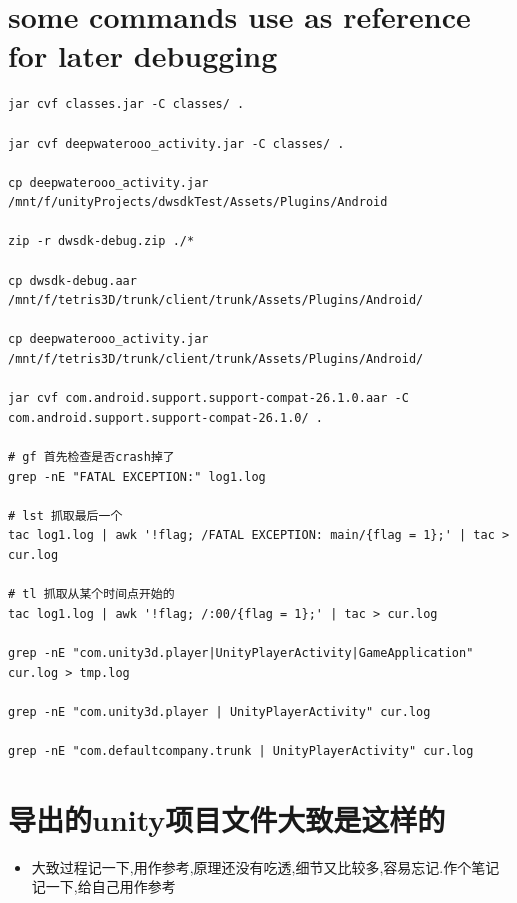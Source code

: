 \documentclass[9pt, b5paper]{article}
\begin{document}
\section{some commands use as reference for later debugging}
\label{sec-3}
\begin{verbatim}
jar cvf classes.jar -C classes/ .

jar cvf deepwaterooo_activity.jar -C classes/ .       

cp deepwaterooo_activity.jar /mnt/f/unityProjects/dwsdkTest/Assets/Plugins/Android 

zip -r dwsdk-debug.zip ./*

cp dwsdk-debug.aar /mnt/f/tetris3D/trunk/client/trunk/Assets/Plugins/Android/

cp deepwaterooo_activity.jar /mnt/f/tetris3D/trunk/client/trunk/Assets/Plugins/Android/

jar cvf com.android.support.support-compat-26.1.0.aar -C com.android.support.support-compat-26.1.0/ .

# gf 首先检查是否crash掉了 
grep -nE "FATAL EXCEPTION:" log1.log

# lst 抓取最后一个
tac log1.log | awk '!flag; /FATAL EXCEPTION: main/{flag = 1};' | tac > cur.log

# tl 抓取从某个时间点开始的
tac log1.log | awk '!flag; /:00/{flag = 1};' | tac > cur.log

grep -nE "com.unity3d.player|UnityPlayerActivity|GameApplication" cur.log > tmp.log

grep -nE "com.unity3d.player | UnityPlayerActivity" cur.log

grep -nE "com.defaultcompany.trunk | UnityPlayerActivity" cur.log
\end{verbatim}

\section{导出的unity项目文件大致是这样的}
\label{sec-4}
\begin{itemize}
\item 大致过程记一下,用作参考,原理还没有吃透,细节又比较多,容易忘记.作个笔记记一下,给自己用作参考
\end{itemize}
\end{document}
